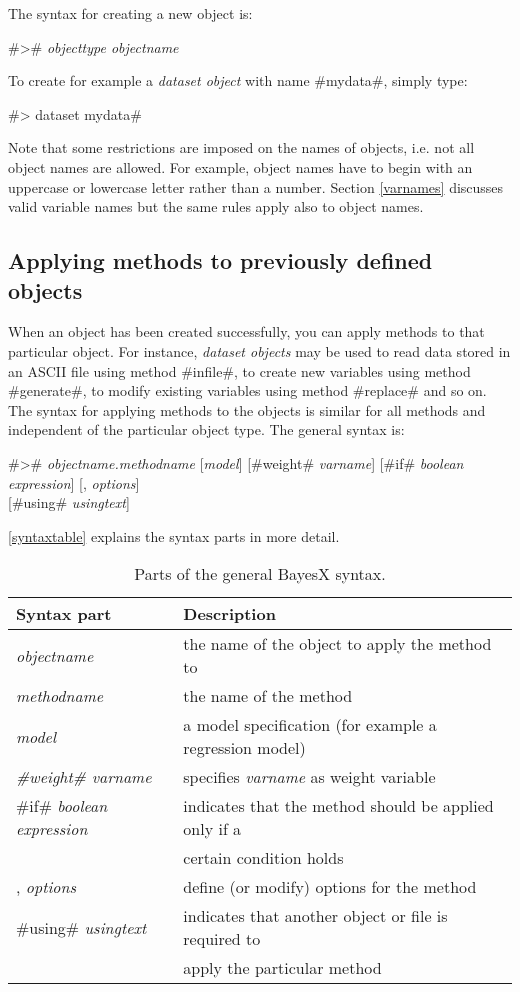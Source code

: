 The syntax for creating a new object is:

#># {\em objecttype objectname}

To create for example a {\em dataset object} with name #mydata#, simply type:

#> dataset mydata#

Note that some restrictions are imposed on the names of objects, i.e. not all object names are allowed. For example, object
names have to begin with an uppercase or lowercase letter rather than a number. Section \ref{varnames} discusses valid variable
names but the same rules apply also to object names.

\subsection{Applying methods to previously defined objects}

When an object has been created successfully, you can apply methods to that particular object. For instance, {\em dataset
objects} may be used to read data stored in an ASCII file using method #infile#, to create new variables using method
#generate#, to modify existing variables using method #replace# and so on. The syntax for applying methods to the objects is
similar for all methods and independent of the particular object type. The general syntax is: 

#># {\em objectname.methodname} [{\em model}] [#weight# {\em varname}] [#if# {\em boolean expression}] [, {\em options}] \\
\hspace*{4.8cm} [#using# {\em usingtext}]

\autoref{syntaxtable} explains the syntax parts in more detail.


\begin{table}[ht]
 \centering
\begin{tabular}{|l|l|}
\hline
Syntax part & Description \\
\hline
{\em objectname} & the name of the object to apply the method to \\
{\em methodname} & the name of the method \\
{\em model} & a model specification (for example a regression model) \\
{\em #weight# varname} & specifies {\em varname} as weight variable \\
#if# {\em boolean expression} & indicates that the method should be applied only if a \\
& certain condition holds \\
, {\em options} & define (or modify) options for the method \\
#using# {\em usingtext} & indicates that another object or file is required to \\
& apply the particular method \\
\hline
\end{tabular}
{\em \caption{\label{syntaxtable}Parts of the general BayesX
syntax.}}
\end{table}

